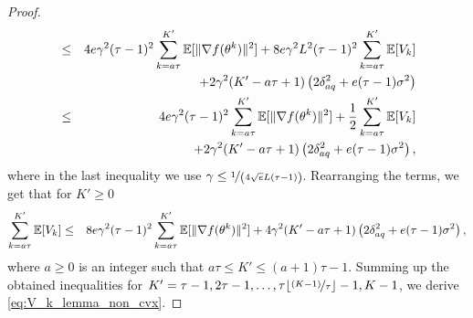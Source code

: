 \begin{proof}
\begin{eqnarray*}
         &\le& 4e\gamma^2(\tau-1)^2\sum\limits_{k=a\tau}^{K'} \mathbb{E}[\|\nabla f(\theta^k)\|^2] + 8e\gamma^2L^2(\tau-1)^2 \sum\limits_{k=a\tau}^{K'}\mathbb{E}[V_k]\\
         &&\quad + 2\gamma^2(K'-a\tau+1)\left(2\delta_{aq}^2 + e(\tau-1)\sigma^2\right)\\
         &\le& 4e\gamma^2(\tau-1)^2\sum\limits_{k=a\tau}^{K'} \mathbb{E}[\|\nabla f(\theta^k)\|^2] + \frac{1}{2} \sum\limits_{k=a\tau}^{K'}\mathbb{E}[V_k]\notag\\
         &&\quad + 2\gamma^2(K'-a\tau+1)\left(2\delta_{aq}^2 + e(\tau-1)\sigma^2\right),
     \end{eqnarray*}
     where in the last inequality we use $\gamma \le \nicefrac{1}{\left(4\sqrt{e}L(\tau-1)\right)}$. Rearranging the terms, we get that for $K' \ge 0$
     \begin{eqnarray*}
         \sum\limits_{k=a\tau}^{K'} \mathbb{E}[V_k] &\le& 8e\gamma^2(\tau-1)^2\sum\limits_{k=a\tau}^{K'}\mathbb{E}[\|\nabla f(\theta^k)\|^2] + 4\gamma^2(K'-a\tau+1)\left(2\delta_{aq}^2 + e(\tau-1)\sigma^2\right),
     \end{eqnarray*}
     where $a\ge 0$ is an integer such that $a\tau \le K' \le (a+1)\tau - 1$. Summing up the obtained inequalities for $K' = \tau-1, 2\tau-1,\ldots, \tau\lfloor\nicefrac{(K-1)}{\tau}\rfloor - 1, K-1$, we derive \eqref{eq:V_k_lemma_non_cvx}.
\end{proof}

